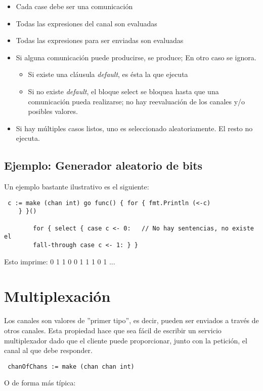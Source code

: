 	\begin{itemize} \item Cada case debe ser una comunicación \item Todas las
	expresiones del canal son evaluadas \item Todas las expresiones para ser
	enviadas son evaluadas \item Si alguna comunicación puede producirse, se
	produce; En otro caso se ignora.  \begin{itemize} \item Si existe una
	cláusula \textit{default}, es ésta la que ejecuta \item Si no existe
	\textit{default}, el bloque select se bloquea hasta que una comunicación
	pueda realizarse; no hay reevaluación de los canales y/o posibles valores.
	\end{itemize} \item Si hay múltiples casos listos, uno es seleccionado
	aleatoriamente. El resto no ejecuta.  \end{itemize}
	
	\subsection{Ejemplo: Generador aleatorio de bits}
	
	Un ejemplo bastante ilustrativo es el siguiente:
	
	\begin{verbatim} c := make (chan int) go func() { for { fmt.Println (<-c)
	} }()
	   
		for { select { case c <- 0:   // No hay sentencias, no existe el
		fall-through case c <- 1: } } \end{verbatim}
	
	Esto imprime: 0 1 1 0 0 1 1 1 0 1 ...

\section{Multiplexación}

Los canales son valores de ''primer tipo'', es decir, pueden ser enviados
a través de otros canales. Esta propiedad hace que sea fácil de escribir un
servicio multiplexador dado que el cliente puede proporcionar, junto con la
petición, el canal al que debe responder.

\begin{verbatim} chanOfChans := make (chan chan int) \end{verbatim} \clearpage
O de forma más típica:

